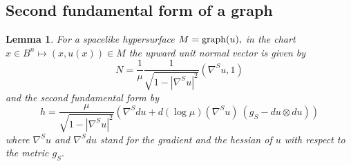 \documentclass[10pt,reqno,oneside]{amsart}
\newtheorem{lem}{Lemma}[section]
\theoremstyle{definition}
\theoremstyle{remark}
\begin{document}
\subsection{Second fundamental form of a graph}
\begin{lem}
For a spacelike hypersurface $M=\hbox{graph}(u),$ in the chart $x\in B^n\mapsto (x,u(x))\in M$ the upward unit normal vector is given by
\begin{equation}\label{expression N}
N=\frac{1}{\mu}\frac{1}{\sqrt{1-|\nabla^S u|^2}}(\nabla^S u, 1)
\end{equation}
and the second fundamental form by
\begin{equation}\label{lem expr h u}
h=\frac{\mu}{\sqrt{1-|\nabla^S u|^2}}\left(\nabla^Sdu+d(\log\mu)(\nabla^S u)\ (g_S-du\otimes du)\right)
\end{equation}
where $\nabla^Su$ and $\nabla^Sdu$ stand for the gradient and the hessian of $u$ with respect to the metric $g_S.$
\end{lem}
\end{document}

